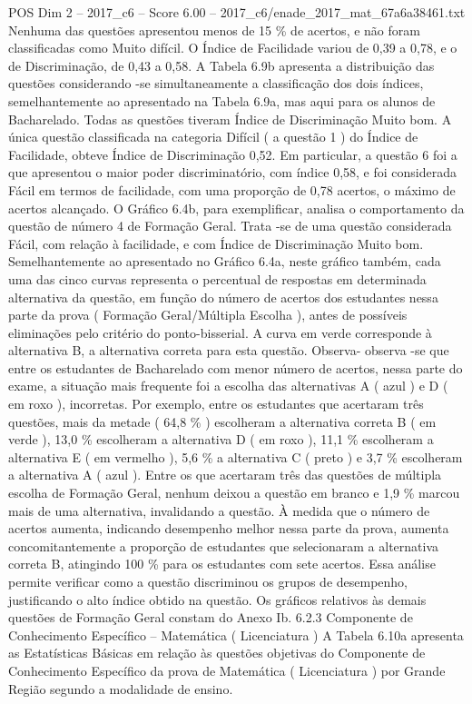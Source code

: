 \begin{textsample}{POS Dim 2 – 2017\_c6 – Score 6.00 – 2017\_c6/enade\_2017\_mat\_67a6a38461.txt}
Nenhuma das questões apresentou menos de 15 \% de acertos, e não foram classificadas como Muito difícil.
O Índice de Facilidade variou de 0,39 a 0,78, e o de Discriminação, de 0,43 a 0,58.
A Tabela 6.9b apresenta a distribuição das questões considerando -se simultaneamente a classificação dos dois índices, semelhantemente ao apresentado na Tabela 6.9a, mas aqui para os alunos de Bacharelado.
Todas as questões tiveram Índice de Discriminação Muito bom.
A única questão classificada na categoria Difícil ( a questão 1 ) do Índice de Facilidade, obteve Índice de Discriminação 0,52.
Em particular, a questão 6 foi a que apresentou o maior poder discriminatório, com índice 0,58, e foi considerada Fácil em termos de facilidade, com uma proporção de 0,78 acertos, o máximo de acertos alcançado.
O Gráfico 6.4b, para exemplificar, analisa o comportamento da questão de número 4 de Formação Geral.
Trata -se de uma questão considerada Fácil, com relação à facilidade, e com Índice de Discriminação Muito bom.
Semelhantemente ao apresentado no Gráfico 6.4a, neste gráfico também, cada uma das cinco curvas representa o percentual de respostas em determinada alternativa da questão, em função do número de acertos dos estudantes nessa parte da prova ( Formação Geral/Múltipla Escolha ), antes de possíveis eliminações pelo critério do ponto-bisserial.
A curva em verde corresponde à alternativa B, a alternativa correta para esta questão.
Observa- observa -se que entre os estudantes de Bacharelado com menor número de acertos, nessa parte do exame, a situação mais frequente foi a escolha das alternativas A ( azul ) e D ( em roxo ), incorretas.
Por exemplo, entre os estudantes que acertaram três questões, mais da metade ( 64,8 \% ) escolheram a alternativa correta B ( em verde ), 13,0 \% escolheram a alternativa D ( em roxo ), 11,1 \% escolheram a alternativa E ( em vermelho ), 5,6 \% a alternativa C ( preto ) e 3,7 \% escolheram a alternativa A ( azul ).
Entre os que acertaram três das questões de múltipla escolha de Formação Geral, nenhum deixou a questão em branco e 1,9 \% marcou mais de uma alternativa, invalidando a questão.
À medida que o número de acertos aumenta, indicando desempenho melhor nessa parte da prova, aumenta concomitantemente a proporção de estudantes que selecionaram a alternativa correta B, atingindo 100 \% para os estudantes com sete acertos.
Essa análise permite verificar como a questão discriminou os grupos de desempenho, justificando o alto índice obtido na questão.
Os gráficos relativos às demais questões de Formação Geral constam do Anexo Ib. 6.2.3 Componente de Conhecimento Específico – Matemática ( Licenciatura ) A Tabela 6.10a apresenta as Estatísticas Básicas em relação às questões objetivas do Componente de Conhecimento Específico da prova de Matemática ( Licenciatura ) por Grande Região segundo a modalidade de ensino.

\end{textsample}
